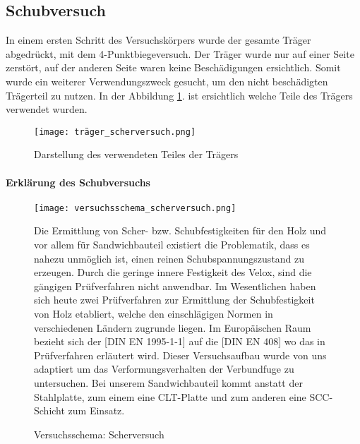 \documentclass[12 pt,a4 paper ]{scrreprt}
\begin{document}
\subsection{Schubversuch}


In einem ersten Schritt des Versuchskörpers wurde der gesamte Träger abgedrückt, mit dem 4-Punktbiegeversuch. Der Träger wurde nur auf einer Seite zerstört, auf der anderen Seite waren keine Beschädigungen ersichtlich. Somit wurde ein weiterer Verwendungszweck gesucht, um den nicht beschädigten Trägerteil zu nutzen. In der Abbildung \ref{träger_scherversuch}. ist ersichtlich welche Teile des Trägers verwendet wurden. 


\begin{figure}[h]
\begin{center}
\texttt{[image: träger\_scherversuch.png]}
\caption{Darstellung des verwendeten Teiles der Trägers}
\label{träger_scherversuch}
\end{center}
\end{figure}

\paragraph{Erklärung des Schubversuchs}

\begin{figure}
\begin{minipage}[hbt]{8cm}
	\texttt{[image: versuchsschema\_scherversuch.png]}
	\caption{Versuchsschema: Scherversuch }
	\label{versuchsschema_scherversuch}
\end{minipage}
\hfill
\begin{minipage}[hbt]{8cm}
Die Ermittlung von Scher- bzw. Schubfestigkeiten für den Holz und vor allem für  Sandwichbauteil existiert die Problematik, dass es nahezu unmöglich ist, einen reinen Schubspannungszustand zu erzeugen. Durch die geringe innere Festigkeit des Velox, sind die gängigen Prüfverfahren nicht anwendbar. 
Im Wesentlichen haben sich heute zwei Prüfverfahren zur Ermittlung der Schubfestigkeit von Holz etabliert, welche den einschlägigen Normen in verschiedenen Ländern zugrunde liegen. Im Europäischen Raum bezieht sich der [DIN EN 1995-1-1] auf die [DIN EN 408] wo das in Prüfverfahren erläutert wird. Dieser Versuchsaufbau wurde von uns adaptiert um das Verformungsverhalten der Verbundfuge zu untersuchen. Bei unserem Sandwichbauteil kommt anstatt der Stahlplatte, zum einem eine CLT-Platte und zum anderen eine SCC-Schicht zum Einsatz.

\end{minipage}
\end{figure}
\end{document}

